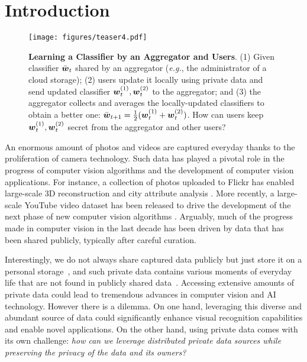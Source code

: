\documentclass[10pt,twocolumn,letterpaper]{article}
\def\vct#1{\mbox{\boldmath $#1$}}
\def\eg{{\it e.g.}}
\def\ui#1{^{(#1)}}
\begin{document}
\section{Introduction}
\begin{figure}[t]
\centering
\texttt{[image: figures/teaser4.pdf]}
\caption{{\bf Learning a Classifier by an Aggregator and Users}. (1) Given classifier $\bar{\vct{w}}_t$ shared by an aggregator (\eg, the administrator of a cloud storage); (2) users update it locally using private data and send updated classifier $\vct{w}\ui{1}_t, \vct{w}\ui{2}_t$ to the aggregator; and (3) the aggregator collects and averages the locally-updated classifiers to obtain a better one: $\bar{\vct{w}}_{t+1} = \frac{1}{2}(\vct{w}\ui{1}_t + \vct{w}\ui{2}_t)$. How can users keep $\vct{w}\ui{1}_t, \vct{w}\ui{2}_t$ secret from the aggregator and other users?}
\label{fig:teaser}
\end{figure}

An enormous amount of photos and videos are captured everyday thanks to the proliferation of camera technology. Such data has played a pivotal role in the progress of computer vision algorithms and the development of computer vision applications. For instance, a collection of photos uploaded to Flickr has enabled large-scale 3D reconstruction \cite{Agarwal2011a} and city attribute analysis \cite{Zhou2014a}. More recently, a large-scale YouTube video dataset has been released to drive the development of the next phase of new computer vision algorithms \cite{Sami2016}. Arguably, much of the progress made in computer vision in the last decade has been driven by data that has been shared publicly, typically after careful curation.

Interestingly, we do not always share captured data publicly but just store it on a personal storage~\cite{Hoyle2014}, and such private data contains various moments of everyday life that are not found in publicly shared data~\cite{Ahern2007,Chowdhury2016,Hoyle2015,Kairam2016}. Accessing extensive amounts of private data could lead to tremendous advances in computer vision and AI technology. However there is a dilemma. On one hand, leveraging this diverse and abundant source of data could significantly enhance visual recognition capabilities and enable novel applications. On the other hand, using private data comes with its own challenge: \emph{how can we leverage distributed private data sources while preserving the privacy of the data and its owners?}
\end{document}
